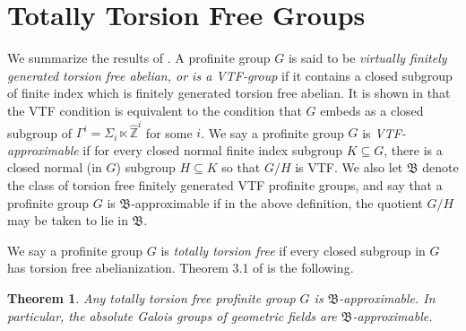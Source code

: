 \documentclass[11pt]{article}
\newcommand\mb{\mathbb}
\newtheorem{Theorem}{Theorem}[section]
\begin{document}
 \section{Totally Torsion Free Groups}
We summarize the results of  \cite{royg1}.  A  profinite group $G$  is said to be {\em virtually finitely generated  torsion free abelian, or is a  VTF-group} if it contains a closed subgroup of finite index which is finitely generated torsion free abelian. It is shown in \cite{royg1}   that the VTF condition is equivalent to the condition that $G$ embeds as a closed subgroup of $\Gamma ^i  = \Sigma _i \ltimes \hat{\mb{Z}}^i$ for some $i$. We say a  profinite group $G$ is {\em VTF-approximable } if for every closed normal finite index subgroup $K\subseteq G$, there is a closed normal (in $G$)  subgroup $H \subseteq K$  so that $G/H$ is VTF.
We also let $\mathfrak{B}$ denote the class of torsion free finitely generated  VTF profinite groups, and say that a profinite group $G$ is $\mathfrak{B}$-approximable  if in the above definition, the quotient $G/H$ may be taken to lie in $\mathfrak{B}$. 

We say a  profinite group $G$ is {\em totally torsion free} if every closed subgroup in $G$ has torsion free abelianization.   Theorem 3.1 of \cite{royg1} is the following. 

\begin{Theorem}
    Any totally torsion free profinite group $G$ is $\mathfrak{B}$-approximable.  In particular, the absolute Galois groups of geometric fields are $\mathfrak{B}$-approximable.
\end{Theorem}
\end{document}
